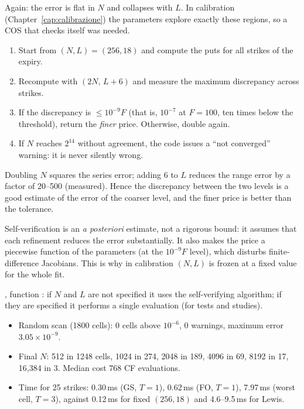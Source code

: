 Again: the error is flat in $N$ and collapses with $L$. In calibration (Chapter~\ref{cap:calibrazione}) the
parameters explore exactly these regions, so a COS that checks itself was needed.

\begin{idea}[title={Key idea: the self-verifying algorithm}]
\begin{enumerate}
\item Start from $(N,L)=(256,18)$ and compute the puts for all strikes of the expiry.
\item Recompute with $(2N,\,L+6)$ and measure the maximum discrepancy across strikes.
\item If the discrepancy is $\le10^{-9}F$ (that is, $10^{-7}$ at $F=100$, ten times below the threshold), return the
\emph{finer} price. Otherwise, double again.
\item If $N$ reaches $2^{14}$ without agreement, the code issues a ``not converged'' warning: it is never silently
wrong.
\end{enumerate}
Doubling $N$ squares the series error; adding 6 to $L$ reduces the range error by a factor of 20--500 (measured).
Hence the discrepancy between the two levels is a good estimate of the error of the coarser level, and the finer price
is better than the tolerance.
\end{idea}

\begin{attenzione}
Self-verification is an \emph{a posteriori} estimate, not a rigorous bound: it assumes that each refinement reduces
the error substantially. It also makes the price a piecewise function of the parameters (at the $10^{-9}F$ level),
which disturbs finite-difference Jacobians. This is why in calibration $(N,L)$ is frozen at a fixed value for the
whole fit.
\end{attenzione}

\begin{progetto}[title={In the qpricer project: self-verifying COS}]
, function : if $N$ and $L$ are not specified it uses the
self-verifying algorithm; if they are specified it performs a single evaluation (for tests and studies).
\begin{itemize}
\item Random scan (1800 cells): 0 cells above $10^{-6}$, 0 warnings, maximum error ${3.05\times10^{-9}}$.
\item Final $N$: 512 in 1248 cells, 1024 in 274, 2048 in 189, 4096 in 69, 8192 in 17, 16{,}384 in 3. Median cost 768
CF evaluations.
\item Time for 25 strikes: 0.30\,ms (GS, $T=1$), 0.62\,ms (FO, $T=1$), 7.97\,ms (worst cell, $T=3$), against 0.12\,ms
for fixed $(256,18)$ and 4.6--9.5\,ms for Lewis.
\end{itemize}
\end{progetto}

